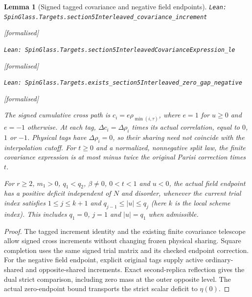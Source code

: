\documentclass[11pt]{article}
\providecommand{\lean}[1]{\leavevmode\par\nopagebreak
  {\noindent\normalfont\footnotesize\raggedright\texttt{Lean: #1}\par}\nopagebreak}
\providecommand{\leanok}{\par\nopagebreak
  {\noindent\normalfont\footnotesize\textcolor{green!50!black}{[formalised]}\par}\nopagebreak}
\newtheorem{lemma}[theorem]{Lemma}
\begin{document}
\begin{lemma}[Signed tagged covariance and negative field endpoints]
\lean{SpinGlass.Targets.section5Interleaved\_covariance\_increment}\leanok
\lean{SpinGlass.Targets.section5InterleavedCovarianceExpression\_le}\leanok
\lean{SpinGlass.Targets.exists\_section5Interleaved\_zero\_gap\_negative}\leanok
The signed cumulative cross path is $c_i=e\rho_{\min(i,\tau)}$, where
$e=1$ for $u\ge0$ and $e=-1$ otherwise. At each tag,
$\Delta c_i=\Delta\rho_i$ times its actual correlation, equal to $0$, $1$
or $-1$. Physical tags have $\Delta\rho_i=0$, so their sharing need not
coincide with the interpolation cutoff. For $t\ge0$ and a normalized,
nonnegative split law, the finite covariance expression is at most minus
twice the original Parisi correction times $t$.

For $r\ge2$, $m_1>0$, $q_1<q_2$, $\beta\ne0$, $0<t<1$ and $u<0$, the
actual field endpoint has a positive deficit independent of $N$ and disorder,
whenever the current trial index satisfies $1\le j\le k+1$ and
$q_{j-1}\le |u|\le q_j$ (here $k$ is the local scheme index).
This includes $q_1=0$, $j=1$ and $|u|=q_1$ when admissible.
\end{lemma}
\begin{proof}
The tagged increment identity and the existing finite covariance telescope
allow signed cross increments without changing frozen physical sharing.
Square completion uses the same signed trial matrix and its checked endpoint
correction. For the negative field endpoint, explicit original tags supply
active ordinary-shared and opposite-shared increments. Exact second-replica
reflection gives the dual strict comparison, including zero mass at the
outer opposite level. The actual zero-endpoint bound transports the strict
scalar deficit to $\eta(0)$.
\end{proof}
\end{document}
